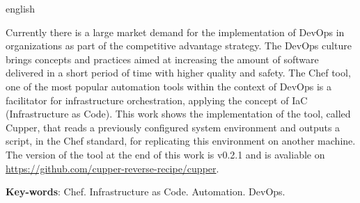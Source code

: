 \begin{resumo}[Abstract]
 \begin{otherlanguage*}{english}

    Currently there is a large market demand for the implementation
    of DevOps in organizations as part of the competitive advantage
    strategy. The DevOps culture brings concepts and practices aimed at increasing
    the amount of software delivered in a short period of time with higher quality
    and safety. The Chef tool, one of the most popular automation tools within the
    context of DevOps is a facilitator for infrastructure orchestration, applying
    the concept of IaC (Infrastructure as Code). This work shows the implementation
    of the tool, called Cupper, that reads a previously configured system environment
    and outputs a script, in the Chef standard, for replicating this environment
    on another machine. The version of the tool at the end of this work is v0.2.1 and
    is avaliable on \url{https://github.com/cupper-reverse-recipe/cupper}.

   \vspace{\onelineskip}
 
   \noindent 
   \textbf{Key-words}: Chef. Infrastructure as Code. Automation. DevOps.
 \end{otherlanguage*}
\end{resumo}

